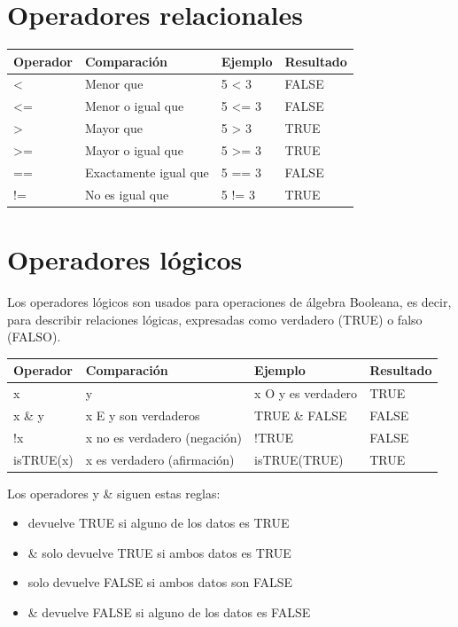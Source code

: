 \documentclass[
]{book}
\begin{document}
\hypertarget{operadores-relacionales}{%
\section{Operadores relacionales}\label{operadores-relacionales}}

\begin{longtable}[]{@{}llll@{}}
\toprule
Operador & Comparación & Ejemplo & Resultado \\
\midrule
\endhead
\textless{} & Menor que & 5 \textless{} 3 & FALSE \\
\textless= & Menor o igual que & 5 \textless= 3 & FALSE \\
\textgreater{} & Mayor que & 5 \textgreater{} 3 & TRUE \\
\textgreater= & Mayor o igual que & 5 \textgreater= 3 & TRUE \\
== & Exactamente igual que & 5 == 3 & FALSE \\
!= & No es igual que & 5 != 3 & TRUE \\
\bottomrule
\end{longtable}

\hypertarget{operadores-luxf3gicos}{%
\section{Operadores lógicos}\label{operadores-luxf3gicos}}

Los operadores lógicos son usados para operaciones de álgebra Booleana, es decir, para describir relaciones lógicas, expresadas como verdadero (TRUE) o falso (FALSO).

\begin{longtable}[]{@{}llll@{}}
\toprule
Operador & Comparación & Ejemplo & Resultado \\
\midrule
\endhead
x & y & x O y es verdadero & TRUE \\
x \& y & x E y son verdaderos & TRUE \& FALSE & FALSE \\
!x & x no es verdadero (negación) & !TRUE & FALSE \\
isTRUE(x) & x es verdadero (afirmación) & isTRUE(TRUE) & TRUE \\
\bottomrule
\end{longtable}

Los operadores \textbar{} y \& siguen estas reglas:

\begin{itemize}
\item
  devuelve TRUE si alguno de los datos es TRUE
\item
  \& solo devuelve TRUE si ambos datos es TRUE
\item
  solo devuelve FALSE si ambos datos son FALSE
\item
  \& devuelve FALSE si alguno de los datos es FALSE
\end{itemize}
\end{document}
